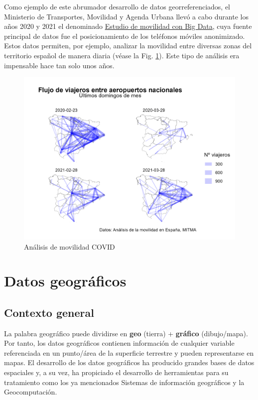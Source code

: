 \documentclass[
]{report}
\theoremstyle{definition}
\theoremstyle{definition}
\theoremstyle{definition}
\theoremstyle{definition}
\theoremstyle{remark}
\begin{document}
Como ejemplo de este abrumador desarrollo de datos georreferenciados, el
Ministerio de Transportes, Movilidad y Agenda Urbana llevó a cabo durante los
años 2020 y 2021 el denominado \href{https://www.mitma.gob.es/ministerio/covid-19/evolucion-movilidad-big-data}{Estudio de movilidad con Big
Data},
cuya fuente principal de datos fue el posicionamiento de los teléfonos móviles
anonimizado. Estos datos permiten, por ejemplo, analizar la movilidad entre
diversas zonas del territorio español de manera diaria (véase la Fig.
\ref{fig:mov}). Este tipo de análisis era impensable hace tan solo unos años.

\begin{figure}

{\centering \includegraphics[width=0.6\linewidth]{img/movilidad_covid} 

}

\caption{Análisis de movilidad COVID}\label{fig:mov}
\end{figure}

\hypertarget{datos-geogruxe1ficos}{%
\chapter{Datos geográficos}\label{datos-geogruxe1ficos}}

\hypertarget{contexto-general}{%
\section{Contexto general}\label{contexto-general}}

La palabra geográfico puede dividirse en \textbf{geo} (tierra) + \textbf{gráfico}
(dibujo/mapa). Por tanto, los datos geográficos contienen información de
cualquier variable referenciada en un punto/área de la superficie terrestre y
pueden representarse en mapas. El desarrollo de los datos geográficos ha
producido grandes bases de datos espaciales y, a su vez, ha propiciado el
desarrollo de herramientas para su tratamiento como los ya mencionados Sistemas
de información geográficos y la Geocomputación.
\end{document}
